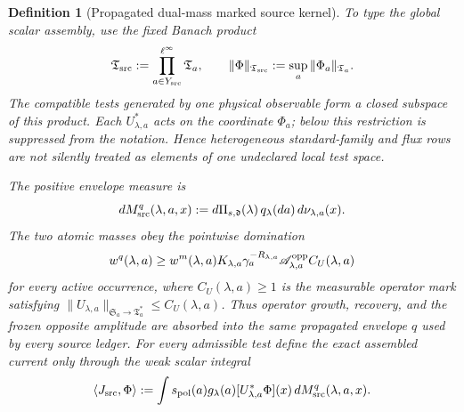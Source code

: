 \documentclass[11pt]{article}
\newtheorem{definition}[theorem]{Definition}
\begin{document}
\begin{definition}[Propagated dual-mass marked source kernel]
To type the global scalar assembly, use the fixed Banach product
\begin{equation}
\label{eq:global-source-test-space}
 \mathfrak T_{\rm src}:=
 \prod_{a\in Y_{\rm src}}^{\ell^\infty}\mathfrak T_a,
 \qquad
 \|\Phi\|_{\mathfrak T_{\rm src}}
 :=\sup_a\|\Phi_a\|_{\mathfrak T_a}.
\end{equation}
The compatible tests generated by one physical observable form a closed
subspace of this product.  Each $U_{\lambda,a}^*$ acts on the coordinate
$\Phi_a$; below this restriction is suppressed from the notation.  Hence
heterogeneous standard-family and flux rows are not silently treated as
elements of one undeclared local test space.

The positive envelope measure is
\begin{equation}
\label{eq:source-incidence-space}
 dM_{\rm src}^{q}(\lambda,a,x):=
 d\Pi_{s,\mathfrak d}(\lambda)\,q_\lambda(da)\,d\nu_{\lambda,a}(x).
\end{equation}
The two atomic masses obey the pointwise domination
\begin{equation}
\label{eq:source-incidence-envelope}
 w^q(\lambda,a)\ge w^m(\lambda,a)K_{\lambda,a}
 \gamma_a^{-R_{\lambda,a}}\mathscr A_{\lambda,a}^{\rm opp}
 C_U(\lambda,a)
\end{equation}
for every active occurrence, where $C_U(\lambda,a)\ge1$ is the measurable
operator mark satisfying
$\|U_{\lambda,a}\|_{\mathfrak S_a\to\mathfrak T_a^*}
\le C_U(\lambda,a)$.  Thus operator growth, recovery, and the frozen
opposite amplitude are absorbed into the same propagated envelope $q$ used
by every source ledger.  For every admissible test define
the exact assembled current only through the weak scalar integral
\begin{equation}
\label{eq:marked-source-assembled-pairing}
 \langle J_{\rm src},\Phi\rangle:=
 \int s_{\rm pol}(a)
       g_\lambda(a)[U_{\lambda,a}^{*}\Phi](x)
       \,dM_{\rm src}^{q}(\lambda,a,x).
\end{equation}


\end{definition}
\end{document}
